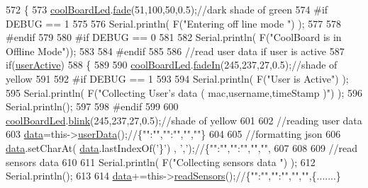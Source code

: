 \begin{DoxyCode}
572 \{
573     \hyperlink{class_cool_board_a1b1d3c684a5baa56b08486e192fd8e97}{coolBoardLed}.\hyperlink{class_cool_board_led_af1cacbaa88db8bcf6042c1083ba41155}{fade}(51,100,50,0.5);\textcolor{comment}{//dark shade of green  }
574 \textcolor{preprocessor}{#if DEBUG == 1  }
575     
576     Serial.println( F(\textcolor{stringliteral}{"Entering off line mode "}) ); 
577     
578 \textcolor{preprocessor}{#endif}
579 
580 \textcolor{preprocessor}{#if DEBUG == 0}
581 
582     Serial.println( F(\textcolor{stringliteral}{"CoolBoard is in Offline Mode"}));
583 
584 \textcolor{preprocessor}{#endif}
585 
586     \textcolor{comment}{//read user data if user is active}
587     \textcolor{keywordflow}{if}(\hyperlink{class_cool_board_a6395459131d6889a3005f79c7a35e964}{userActive})
588     \{
589 
590         \hyperlink{class_cool_board_a1b1d3c684a5baa56b08486e192fd8e97}{coolBoardLed}.\hyperlink{class_cool_board_led_ab778f5e7bed0ab74e3906d82110493c3}{fadeIn}(245,237,27,0.5);\textcolor{comment}{//shade of yellow}
591 
592 \textcolor{preprocessor}{    #if DEBUG == 1}
593         
594         Serial.println( F(\textcolor{stringliteral}{"User is Active"}) );
595         Serial.println( F(\textcolor{stringliteral}{"Collecting User's data ( mac,username,timeStamp )"}) );
596         Serial.println();
597 
598 \textcolor{preprocessor}{    #endif}
599 
600         \hyperlink{class_cool_board_a1b1d3c684a5baa56b08486e192fd8e97}{coolBoardLed}.\hyperlink{class_cool_board_led_a96e1ea13003eee34c9dbcef340404426}{blink}(245,237,27,0.5);\textcolor{comment}{//shade of yellow   }
601 
602         \textcolor{comment}{//reading user data}
603         \hyperlink{class_cool_board_a427fb753dd8575bdf821c70a5c63d695}{data}=this->\hyperlink{class_cool_board_ae7358fb6e623cfc81b775f5f1734909b}{userData}();\textcolor{comment}{//\{"":"","":"","",""\}}
604 
605         \textcolor{comment}{//formatting json }
606         \hyperlink{class_cool_board_a427fb753dd8575bdf821c70a5c63d695}{data}.setCharAt( \hyperlink{class_cool_board_a427fb753dd8575bdf821c70a5c63d695}{data}.lastIndexOf(\textcolor{charliteral}{'\}'}) , \textcolor{charliteral}{','});\textcolor{comment}{//\{"":"","":"","","",}
607         
608                 
609         \textcolor{comment}{//read sensors data}
610 
611         Serial.println( F(\textcolor{stringliteral}{"Collecting sensors data "}) );
612         Serial.println();
613 
614         \hyperlink{class_cool_board_a427fb753dd8575bdf821c70a5c63d695}{data}+=this->\hyperlink{class_cool_board_ad03abdce2e65f520bbf2cff0f2d083cf}{readSensors}();\textcolor{comment}{//\{"":"","":"","","",\{.......\}}

\end{DoxyCode}
